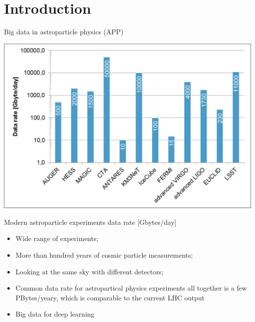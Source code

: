 
\begin{frame}
\titlepage
\end{frame}

\section{Introduction}

\begin{frame}{Big data in astroparticle physics (APP)}
\small
\begin{minipage}[c]{0.58\textwidth}
  \begin{center}
      \includegraphics[width=1\textwidth]{pics/appec_computing-diagram.pdf}
  \end{center}
  \vspace{-2\parsep}
  \small Modern astroparticle experiments data rate [Gbytes/day]\footnotemark[1] %
\end{minipage}
\hfill
\begin{minipage}[c]{0.41\textwidth}
  \begin{itemize}
    \setlength{\itemsep}{0pt}
    \item Wide range of experiments;
    \item More than hundred years of cosmic particle measurements;
    \item Looking at the same sky with different detectors;
    \item Common data rate for astropartical physics experiments all together is a few PBytes/yeary, which is comparable to the current LHC output\footnotemark[1]
    \item Big data for deep learning
  \end{itemize}
\end{minipage}
\footnotesize{}
\end{frame}

